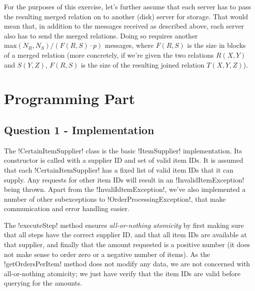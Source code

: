 \documentclass[a4paper, 12pt]{article}
\begin{document}
For the purposes of this exercise, let's further assume that each
server has to pass the resulting merged relation on to another (disk)
server for storage. That would mean that, in addition to the messages
received as described above, each server also has to send the merged
relations. Doing so requires another $\textrm{max}(N_R, N_S) / (F(R,
S) \cdot p)$ messages, where $F(R,S)$ is the size in blocks of a
merged relation (more concretely, if we're given the two relations
$R(X,Y)$ and $S(Y,Z)$, $F(R,S)$ is the size of the resulting joined
relation $T(X,Y,Z)$).

\section*{Programming Part}

\subsection*{Question 1 - Implementation}




The !CertainItemSupplier! class is the basic !ItemSupplier!
implementation. Its constructor is called with a supplier ID and set
of valid item IDs. It is assumed that each !CertainItemSupplier! has a
fixed list of valid item IDs that it can supply. Any requests for
other item IDs will result in an !InvalidItemException! being
thrown. Apart from the !InvaliIdtemException!, we've also implemented
a number of other subexceptions to !OrderProcessingException!, that
make communication and error handling easier.

The !executeStep! method ensures \emph{all-or-nothing atomicity} by
first making sure that all steps have the correct supplier ID, and
that all item IDs are available at that supplier, and finally that the
amount requested is a positive number (it does not make sense to order
zero or a negative number of items). As the !getOrdersPerItem! method
does not modify any data, we are not concerned with all-or-nothing
atomicity; we just have verify that the item IDs are valid before
querying for the amounts.
\end{document}
